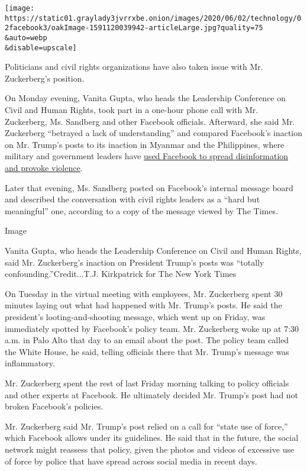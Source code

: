 \texttt{[image: https://static01.graylady3jvrrxbe.onion/images/2020/06/02/technology/02facebook3/oakImage-1591120039942-articleLarge.jpg?quality=75\\\&auto=webp\\\&disable=upscale]}

Politicians and civil rights organizations have also taken issue with
Mr. Zuckerberg's position.

On Monday evening, Vanita Gupta, who heads the Leadership Conference on
Civil and Human Rights, took part in a one-hour phone call with Mr.
Zuckerberg, Ms. Sandberg and other Facebook officials. Afterward, she
said Mr. Zuckerberg ``betrayed a lack of understanding'' and compared
Facebook's inaction on Mr. Trump's posts to its inaction in Myanmar and
the Philippines, where military and government leaders have
\href{https://www.nytimes3xbfgragh.onion/2018/10/15/technology/myanmar-facebook-genocide.html}{used
Facebook to spread disinformation and provoke violence}.

Later that evening, Ms. Sandberg posted on Facebook's internal message
board and described the conversation with civil rights leaders as a
``hard but meaningful'' one, according to a copy of the message viewed
by The Times.

Image

Vanita Gupta, who heads the Leadership Conference on Civil and Human
Rights, said Mr. Zuckerberg's inaction on President Trump's posts was
``totally confounding.''Credit...T.J. Kirkpatrick for The New York Times

On Tuesday in the virtual meeting with employees, Mr. Zuckerberg spent
30 minutes laying out what had happened with Mr. Trump's posts. He said
the president's looting-and-shooting message, which went up on Friday,
was immediately spotted by Facebook's policy team. Mr. Zuckerberg woke
up at 7:30 a.m. in Palo Alto that day to an email about the post. The
policy team called the White House, he said, telling officials there
that Mr. Trump's message was inflammatory.

Mr. Zuckerberg spent the rest of last Friday morning talking to policy
officials and other experts at Facebook. He ultimately decided Mr.
Trump's post had not broken Facebook's policies.

Mr. Zuckerberg said Mr. Trump's post relied on a call for ``state use of
force,'' which Facebook allows under its guidelines. He said that in the
future, the social network might reassess that policy, given the photos
and videos of excessive use of force by police that have spread across
social media in recent days.

